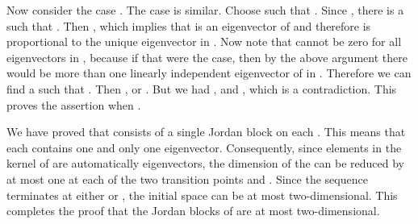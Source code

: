 \documentclass[a4paper,dvips,12pt]{article}
\begin{document}
    Now consider the case \coordHE{}.  The case \coordHE{} is similar.
    Choose \coordHE{} such
    that \coordHE{}.  Since \coordHE{},
    there is a \coordHE{} such that \coordHE{}.  Then \coordHE{}, which implies that \coordHE{} is an eigenvector of
    \coordHE{} and therefore is proportional to
    the unique eigenvector \coordHE{} in \coordHE{}.
    Now note that \coordHE{} cannot be zero for all eigenvectors \coordHE{} in
    \coordHE{}, because if that were the case, then by the
    above argument there would be more than one linearly independent eigenvector of
    \coordHE{} in \coordHE{}.  Therefore we can find a \coordHE{} such that \coordHE{}.
    Then \coordHE{},
    or \coordHE{}.  But we had \coordHE{}, and \coordHE{}, which is a
    contradiction.  This proves the assertion when \coordHE{}.

    We have proved that \coordHE{} consists of a single Jordan
    block on each \coordHE{}.  This means that each \coordHE{} contains one and only one
    eigenvector.  Consequently, since elements in the kernel of
    \coordHE{} are automatically eigenvectors, the dimension of the
    \coordHE{} can be reduced by at most one at each of the two transition
    points
    \coordHE{} and
    \coordHE{}.  Since the
    sequence terminates at either \coordHE{} or \coordHE{}, the
    initial space \coordHE{} can be at most two-dimensional.  This
    completes the proof that the Jordan blocks of \coordHE{} are at most
    two-dimensional.
\end{document}
